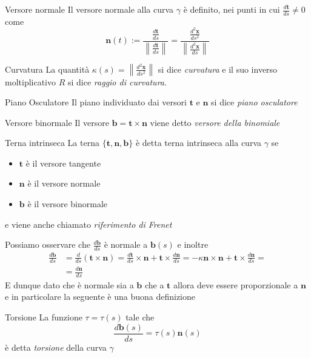 \begin{definition}{Versore normale}
    Il versore normale alla curva \(\gamma\) è definito, nei punti in cui
    \(\frac{d\mathbf{t} }{ds} \neq 0\) come 
    \[
        \mathbf{n} {(t)} := \frac{\frac{d\mathbf{t} }{ds}}{\left\|\frac{d\mathbf{t}
        }{ds}\right\|} = \frac{\frac{d^2 \mathbf{x} }{ds^2}}{\left\|\frac{d^2 \mathbf{x}
    }{ds}\right\|}
    \]

\end{definition}
\begin{definition}{Curvatura}
    La quantità \(\kappa{(s)} = \left\|\frac{d^2 \mathbf{x} }{ds^2}\right\|\) si dice
    \emph{curvatura} e il suo inverso moltiplicativo \(R\) si dice \emph{raggio di
    curvatura}. 
\end{definition}
\begin{definition}{Piano Osculatore}
    Il piano individuato dai versori \(\mathbf{t} \) e \(\mathbf{n} \) si dice
    \emph{piano osculatore}
\end{definition}
\begin{definition}{Versore binormale}
    Il versore \(\mathbf{b} = \mathbf{t}  \times  \mathbf{n} \) viene detto
    \emph{versore della binomiale}
\end{definition}

\begin{definition}{Terna intrinseca}
    La terna \(\{\mathbf{t} , \mathbf{n} , \mathbf{b} \}\) è detta terna
    intrinseca alla curva \(\gamma\) se
    \begin{itemize}
        \item \(\mathbf{t} \) è il versore tangente
        \item \(\mathbf{n} \) è il versore normale
        \item \(\mathbf{b} \) è il versore binormale
    \end{itemize}
    e viene anche chiamato \emph{riferimento di Frenet}

\end{definition}

Possiamo osservare che \(\frac{d\mathbf{b} }{ds}\) è normale a
\(\mathbf{b}{(s)}\) e inoltre
\begin{align*}
    \frac{d\mathbf{b} }{ds} &= \frac{d}{ds}(\mathbf{t}  \times  \mathbf{n} ) =
    \frac{d\mathbf{t} }{ds} \times  \mathbf{n}  + \mathbf{t}  \times
    \frac{d\mathbf{n} }{ds} = -\kappa \mathbf{n}  \times  \mathbf{n}  + \mathbf{t}
    \times \frac{d\mathbf{n} }{ds}=\\
    &= \frac{d\mathbf{n} }{ds}
\end{align*}
E dunque dato che è normale sia a \(\mathbf{b}\) che a \(\mathbf{t} \) allora
deve essere proporzionale a \(\mathbf{n} \) e in particolare la seguente è una
buona definizione
\begin{definition}{Torsione}
    La funzione \(\tau = \tau{(s)}\) tale che
    \[
        \frac{d\mathbf{b}{(s)} }{ds} = \tau{(s)} \mathbf{n}{(s)}
    \]
    è detta \emph{torsione} della curva \(\gamma\)
\end{definition}

